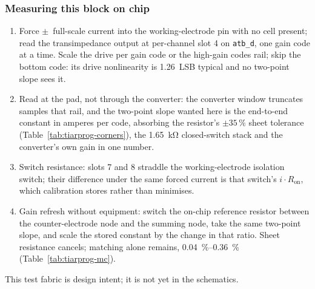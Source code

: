 %

\subsubsection{Measuring this block on chip}

\begin{enumerate}[nosep]
\item Force \(\pm\)~full-scale current into the working-electrode pin with no
  cell present; read the transimpedance output at per-channel slot 4 on
  \texttt{atb\_d}, one gain code at a time. Scale the drive per gain code or
  the high-gain codes rail; skip the bottom code: its drive nonlinearity is
  1.26~LSB typical and no two-point slope sees it.
\item Read at the pad, not through the converter: the converter window
  truncates samples that rail, and the two-point slope wanted here is the
  end-to-end constant in amperes per code, absorbing the resistor's
  \(\pm35\,\%\) sheet tolerance (Table~\ref{tab:tiarprog-corners}), the
  \SI{1.65}{\kilo\ohm} closed-switch stack and the converter's own gain in one
  number.
\item Switch resistance: slots 7 and 8 straddle the working-electrode
  isolation switch; their difference under the same forced current is that
  switch's \(i\!\cdot\!R_{\mathrm{on}}\), which calibration stores rather than
  minimises.
\item Gain refresh without equipment: switch the on-chip reference resistor
  between the counter-electrode node and the summing node, take the same
  two-point slope, and scale the stored constant by the change in that ratio.
  Sheet resistance cancels; matching alone remains,
  \SIrange{0.04}{0.36}{\percent} (Table~\ref{tab:tiarprog-mc}).
\end{enumerate}
This test fabric is design intent; it is not yet in the schematics.
